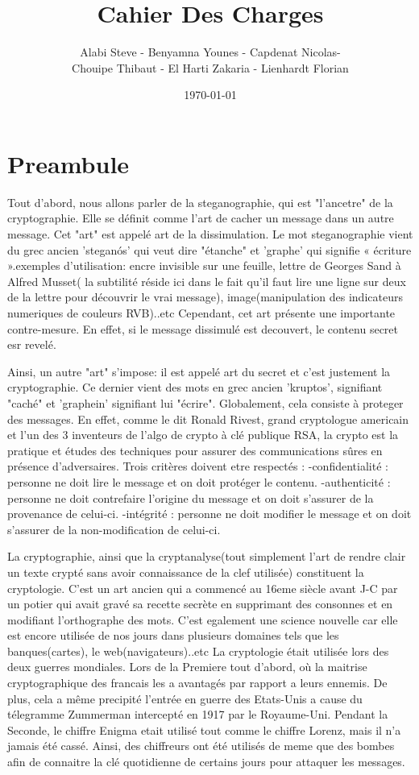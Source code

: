 \documentclass[a4]{article}
\author{Alabi Steve - Benyamna Younes - Capdenat Nicolas- \\
		Chouipe Thibaut - El Harti Zakaria - Lienhardt Florian}
\title{Cahier Des Charges}
\date{\today}
\begin{document}
\maketitle
		\section{Preambule}
				Tout d'abord, nous allons parler de la steganographie, qui est "l'ancetre" de la cryptographie. Elle se définit comme l'art de cacher un message dans un autre message. Cet "art"
				est appelé art de la dissimulation. Le mot steganographie vient du grec 	ancien 'steganós' qui veut dire "étanche" et 'graphe' qui signifie « écriture ».exemples d'utilisation: 
				encre invisible sur une feuille, lettre de Georges Sand à Alfred Musset( la subtilité réside ici dans le fait qu'il faut lire une ligne sur deux de la lettre pour découvrir le vrai message),
				image(manipulation des indicateurs numeriques de couleurs RVB)..etc
				Cependant, cet art présente une importante contre-mesure. En effet, si le message dissimulé est decouvert, le contenu secret esr revelé.

				Ainsi, un autre "art" s'impose: il est appelé art du secret et c'est justement la cryptographie. Ce dernier vient des mots en grec ancien 'kruptos', signifiant "caché" et 'graphein'
				signifiant lui "écrire". Globalement, cela consiste à proteger des messages. En effet, comme le dit Ronald Rivest, grand cryptologue americain et l'un des 3 inventeurs de l'algo
				de crypto à clé publique RSA, la crypto est la pratique et études des techniques pour assurer des communications sûres en présence d'adversaires.
				Trois critères doivent etre respectés : 
				-confidentialité : personne ne doit lire le message et on doit protéger le contenu.
				-authenticité : personne ne doit contrefaire l'origine du message et on doit s'assurer de la provenance de celui-ci.
				-intégrité : personne ne doit modifier le message et on doit s'assurer de la non-modification de celui-ci.

				La cryptographie, ainsi que la cryptanalyse(tout simplement l'art de rendre clair un texte crypté sans avoir connaissance de la clef utilisée) constituent la cryptologie.
				C'est un art ancien qui a commencé au 16eme siècle avant J-C par un potier qui avait gravé sa recette secrète en supprimant des consonnes et en modifiant l'orthographe des mots.
				C'est egalement une science nouvelle car elle est encore utilisée de nos jours dans plusieurs domaines tels que les banques(cartes), le web(navigateurs)..etc
				La cryptologie était utilisée lors des deux guerres mondiales. Lors de la Premiere tout d'abord, où la maitrise cryptographique des francais les a avantagés par rapport a leurs
				ennemis. De plus, cela a même precipité l'entrée en guerre des Etats-Unis a cause du télegramme Zummerman intercepté en 1917 par le Royaume-Uni.
				Pendant la Seconde, le chiffre Enigma etait utilisé tout comme le chiffre Lorenz, mais il n'a jamais été cassé. Ainsi, des chiffreurs ont été utilisés de meme que des bombes afin de 
				connaitre la clé quotidienne de certains jours pour attaquer les messages.
				
\end{document}
